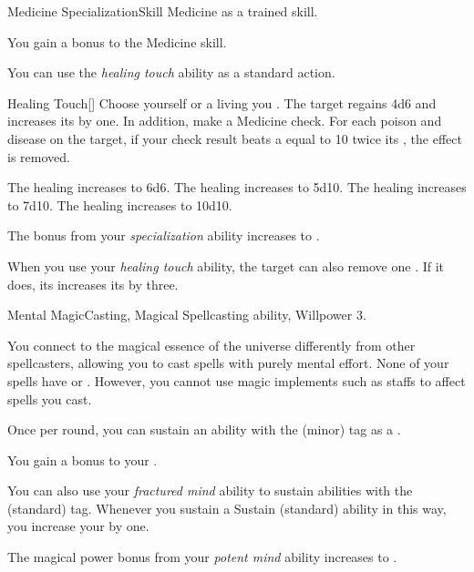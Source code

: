     \begin{feat}{Medicine Specialization}{Skill}
        \featpre Medicine as a trained skill.

         You gain a  bonus to the Medicine skill.

         You can use the \textit{healing touch} ability as a standard action.
        \begin{activeability}{Healing Touch}[]
            \rankline
            Choose yourself or a living  you .
            The target regains 4d6  and increases its  by one.
            In addition, make a Medicine check.
            For each poison and disease on the target, if your check result beats a  equal to 10 \add twice its , the effect is removed.

            \rankline
             The healing increases to 6d6.
             The healing increases to 5d10.
             The healing increases to 7d10.
             The healing increases to 10d10.
        \end{activeability}

         The bonus from your \textit{specialization} ability increases to .

         When you use your \textit{healing touch} ability, the target can also remove one .
        If it does, its increases its  by three.
    \end{feat}

    \begin{magicalfeat}{Mental Magic}{Casting, Magical}
        \featpre Spellcasting ability, Willpower 3.

         You connect to the magical essence of the universe differently from other spellcasters, allowing you to cast spells with purely mental effort.
        None of your spells have  or .
        However, you cannot use magic implements such as staffs to affect spells you cast.

         Once per round, you can sustain an ability with the  (minor) tag as a .

         You gain a  bonus to your .

         You can also use your \textit{fractured mind} ability to sustain abilities with the  (standard) tag.
        Whenever you sustain a Sustain (standard) ability in this way, you increase your  by one.

         The magical power bonus from your \textit{potent mind} ability increases to .
    \end{magicalfeat}


